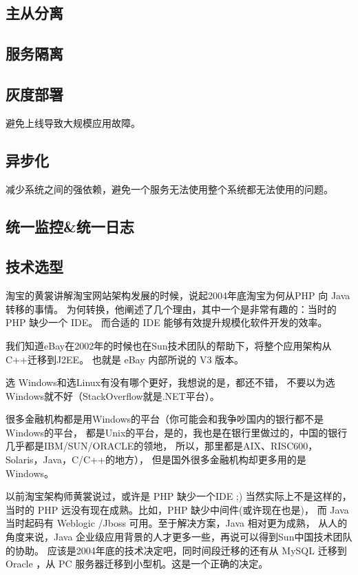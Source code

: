 \documentclass{book}
\begin{document}
\subsection{主从分离}

\subsection{服务隔离}

\subsection{灰度部署}

避免上线导致大规模应用故障。

\subsection{异步化}

减少系统之间的强依赖，避免一个服务无法使用整个系统都无法使用的问题。

\subsection{统一监控\&统一日志}

\subsection{技术选型}

淘宝的黄裳讲解淘宝网站架构发展的时候，说起2004年底淘宝为何从PHP 向 Java 转移的事情。
为何转换，他阐述了几个理由，其中一个是非常有趣的：当时的 PHP 缺少一个 IDE。
而合适的 IDE 能够有效提升规模化软件开发的效率。

我们知道eBay在2002年的时候也在Sun技术团队的帮助下，将整个应用架构从C++迁移到J2EE。
也就是 eBay 内部所说的 V3 版本。

选 Windows和选Linux有没有哪个更好，我想说的是，都还不错，
不要以为选Windows就不好（StackOverflow就是.NET平台）。

很多金融机构都是用Windows的平台（你可能会和我争吵国内的银行都不是Windows的平台，
都是Unix的平台，是的，我也是在银行里做过的，中国的银行几乎都是IBM/SUN/ORACLE的领地，
所以，那里都是AIX、RISC600，Solaris，Java，C/C++的地方），
但是国外很多金融机构却更多用的是Windows。

以前淘宝架构师黄裳说过，或许是 PHP 缺少一个IDE ;) 当然实际上不是这样的，
当时的 PHP 远没有现在成熟。比如，PHP 缺少中间件(或许现在也是)，
而 Java 当时起码有 Weblogic /Jboss 可用。至于解决方案，Java 相对更为成熟，
从人的角度来说，Java 企业级应用背景的人才更多一些，再说可以得到Sun中国技术团队的协助。
应该是2004年底的技术决定吧，同时间段迁移的还有从 MySQL 迁移到 Oracle ，从 PC 服务器迁移到小型机。这是一个正确的决定。
\end{document}
